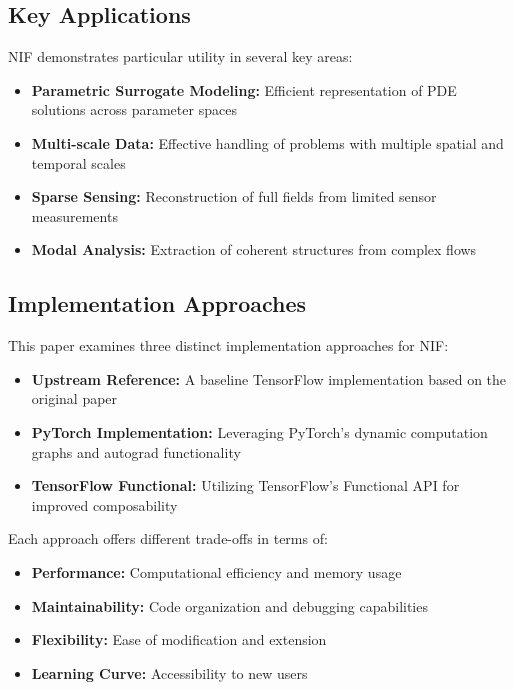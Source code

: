 \documentclass[10pt,journal,compsoc]{IEEEtran}
\begin{document}
\subsection{Key Applications}
NIF demonstrates particular utility in several key areas:

\begin{itemize}
    \item \textbf{Parametric Surrogate Modeling:} Efficient representation of PDE solutions across parameter spaces
    \item \textbf{Multi-scale Data:} Effective handling of problems with multiple spatial and temporal scales
    \item \textbf{Sparse Sensing:} Reconstruction of full fields from limited sensor measurements
    \item \textbf{Modal Analysis:} Extraction of coherent structures from complex flows
\end{itemize}

\subsection{Implementation Approaches}
This paper examines three distinct implementation approaches for NIF:

\begin{itemize}
    \item \textbf{Upstream Reference:} A baseline TensorFlow implementation based on the original paper
    \item \textbf{PyTorch Implementation:} Leveraging PyTorch's dynamic computation graphs and autograd functionality
    \item \textbf{TensorFlow Functional:} Utilizing TensorFlow's Functional API for improved composability
\end{itemize}

Each approach offers different trade-offs in terms of:

\begin{itemize}
    \item \textbf{Performance:} Computational efficiency and memory usage
    \item \textbf{Maintainability:} Code organization and debugging capabilities
    \item \textbf{Flexibility:} Ease of modification and extension
    \item \textbf{Learning Curve:} Accessibility to new users
\end{itemize}
\end{document}
